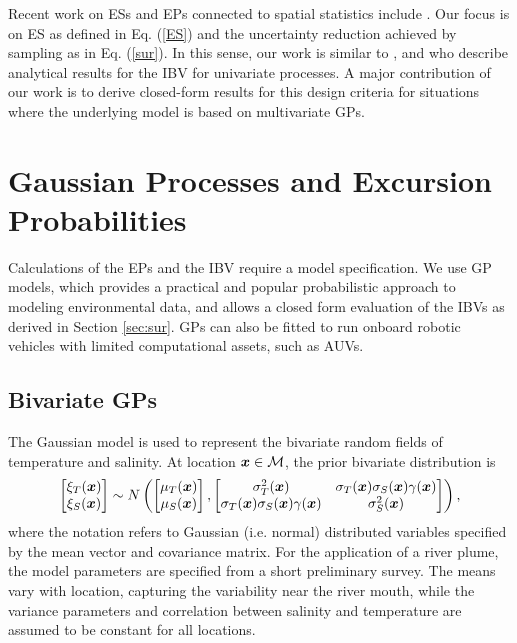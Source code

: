 \documentclass[aoas]{imsart}
\begin{document}
Recent work on ESs and EPs connected to spatial statistics include
\cite{picheny2010,french2013spatio,bolin2015excursion,french2016credible}.
Our focus is on ES as defined in Eq. (\ref{ES}) and the uncertainty
reduction achieved by sampling as in Eq. (\ref{sur}). In this sense,
our work is similar to \cite{bect2012}, \cite{chevalier2014fast} and
\cite{azzimonti2016quantifying} who describe analytical results for the IBV for univariate processes. A major
contribution of our work is to derive closed-form results for this
design criteria for situations where the underlying model is based on multivariate GPs.

\section{Gaussian Processes and Excursion Probabilities}
\label{sec:GP_EP}

Calculations of the EPs and the IBV require a model specification. We use GP models, which provides a practical and popular probabilistic approach to modeling environmental data, and allows a closed form
evaluation of the IBVs as derived in Section \ref{sec:sur}. GPs can also be fitted to run onboard robotic vehicles with limited computational assets, such as AUVs.

\subsection{Bivariate GPs}

The Gaussian model is used to represent the bivariate random fields of temperature and salinity. At location ${\boldsymbol x} \in \mathcal{M}$, the prior bivariate distribution is
\begin{equation}\label{gp_bar}
  \begin{bmatrix}\xi_T(\bx) \\
    \xi_S(\bx) \end{bmatrix}
 \sim N \left( 
\begin{bmatrix} \mu_{T}(\bx)\\
\mu_{S}(\bx)
\end{bmatrix},\begin{bmatrix}
\sigma_{T}^2(\bx) & \sigma_{T}(\bx) \sigma_S(\bx) \gamma(\bx)  \\
\sigma_{T}(\bx) \sigma_S(\bx) \gamma(\bx)  & \sigma_{S}^2(\bx) 
\end{bmatrix}
\right),
\end{equation}
where the notation refers to Gaussian (i.e. normal) distributed variables
specified by the mean vector and covariance matrix. For the application
of a river plume, the model parameters are specified from a short preliminary survey. The means vary with location, capturing the variability near the river mouth, while the variance parameters and correlation between salinity and temperature are assumed to be constant for all locations. %
\end{document}
